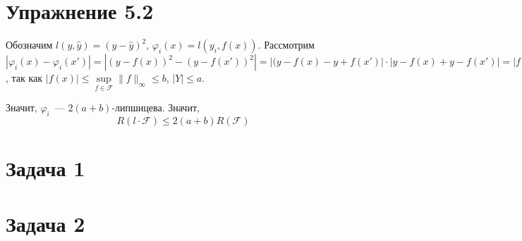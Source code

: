 \documentclass[a4paper]{article}
\newcommand{\F}{\mathcal{F}}
\begin{document}
\section*{Упражнение 5.2}
Обозначим $l(y,\hat{y})=(y-\hat{y})^2$,  $\varphi_i(x)=l(y_i, f(x))$. Рассмотрим $|\varphi_i(x)-\varphi_i(x')|=|(y-f(x))^2-(y-f(x'))^2|=|(y-f(x)-y+f(x')|\cdot |y-f(x)+y-f(x')|=|f(x')-f(x)|\cdot |2y-f(x)-f(x')|\leqslant 2(a+b)|f(x)-f(x')|$, так как $|f(x)|\leqslant \sup\limits_{f\in \F}\|f\|_\infty\leqslant b$, $|Y|\leqslant a$.

Значит, $\varphi_i$~--- $2(a+b)$-липшицева. Значит,
$$
\boxed{R(l\cdot \F)\leqslant 2(a+b)R(\F)}
$$
\section*{Задача 1}
\section*{Задача 2}
\end{document}
